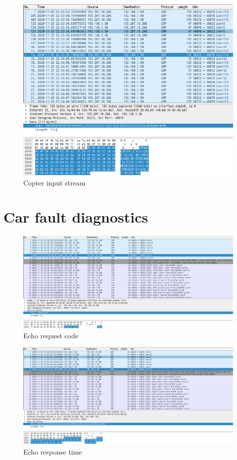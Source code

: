 \documentclass[12pt, a4paper]{article}
\begin{document}
\begin{figure}[h!]
\centering
	\includegraphics[height=.4\textheight, width=\textwidth, keepaspectratio]{assets/wireshark/copter4.png}
	\caption{Copter input stream} 
\end{figure}

\section{Car fault diagnostics}

\begin{figure}[h!]
\centering
	\includegraphics[height=.4\textheight, width=\textwidth, keepaspectratio]{assets/wireshark/vehicle1.png}
	\caption{Echo request code} 
\end{figure}

\pagebreak
\begin{figure}[h!]
\centering
	\includegraphics[height=.4\textheight, width=\textwidth, keepaspectratio]{assets/wireshark/vehicle2.png}
	\caption{Echo response time} 
\end{figure}
\end{document}
